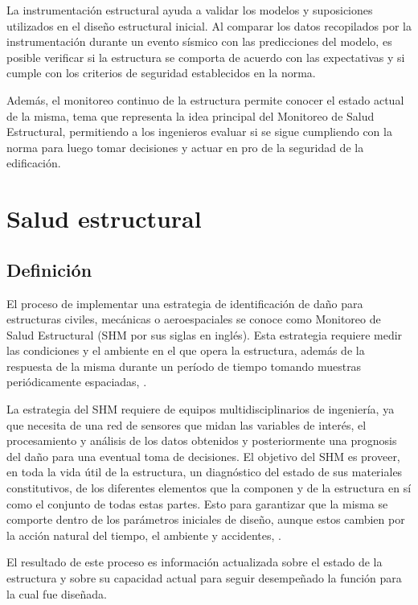 La instrumentación estructural ayuda a validar los modelos y suposiciones utilizados en el diseño estructural inicial. Al comparar los datos recopilados por la instrumentación durante un evento sísmico con las predicciones del modelo, es posible verificar si la estructura se comporta de acuerdo con las expectativas y si cumple con los criterios de seguridad establecidos en la norma.

Además, el monitoreo continuo de la estructura permite conocer el estado actual de la misma, tema que representa la idea principal del Monitoreo de Salud Estructural, permitiendo a los ingenieros evaluar si se sigue cumpliendo con la norma para luego tomar decisiones y actuar en pro de la seguridad de la edificación.


\section{Salud estructural}

\subsection{Definición}


El proceso de implementar una estrategia de identificación de daño para estructuras civiles, mecánicas o aeroespaciales se conoce como Monitoreo de Salud Estructural (SHM por sus siglas en inglés). Esta estrategia requiere medir las condiciones y el ambiente en el que opera la estructura, además de la respuesta de la misma durante un período de tiempo tomando muestras periódicamente espaciadas, \citep{farrar2007introduction}.


La estrategia del SHM requiere de equipos multidisciplinarios de ingeniería, ya que necesita de una red de sensores que midan las variables de interés, el procesamiento y análisis de los datos obtenidos y posteriormente una prognosis del daño para una eventual toma de decisiones. El objetivo del SHM es proveer, en toda la vida útil de la estructura, un diagnóstico del estado de sus materiales constitutivos, de los diferentes elementos que la componen y de la estructura en sí como el conjunto de todas estas partes. Esto para garantizar que la misma se comporte dentro de los parámetros iniciales de diseño, aunque estos cambien por la acción natural del tiempo, el ambiente y accidentes, \citep{balageas2010structural}.

El resultado de este proceso es información actualizada sobre el estado de la estructura y sobre su capacidad actual para seguir desempeñado la función para la cual fue diseñada.

